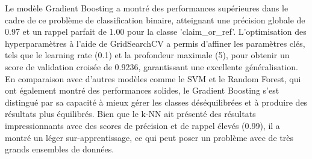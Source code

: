 Le modèle Gradient Boosting a montré des performances supérieures dans le cadre de ce problème de classification binaire, atteignant une précision globale de 0.97 et un rappel parfait de 1.00 pour la classe 'claim\_or\_ref'.
L'optimisation des hyperparamètres à l'aide de GridSearchCV a permis d'affiner les paramètres clés, tels que le learning rate (0.1) et la profondeur maximale (5), pour obtenir un score de validation croisée de 0.9236, garantissant une excellente généralisation.
En comparaison avec d'autres modèles comme le SVM et le Random Forest, qui ont également montré des performances solides, le Gradient Boosting s'est distingué par sa capacité à mieux gérer les classes déséquilibrées et à produire des résultats plus équilibrés.
Bien que le k-NN ait présenté des résultats impressionnants avec des scores de précision et de rappel élevés (0.99), il a montré un léger sur-apprentissage, ce qui peut poser un problème avec de très grands ensembles de données.
\vspace{-1em}
